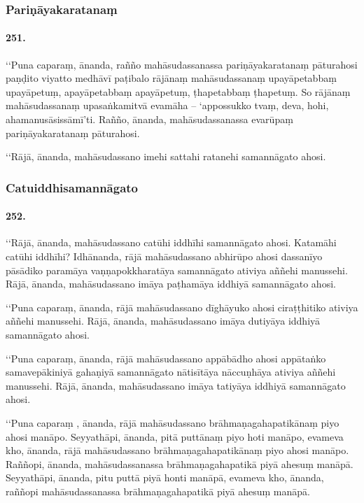 \subsubsection{Pariṇāyakaratanaṃ}

\paragraph{251.} ‘‘Puna caparaṃ, ānanda, rañño mahāsudassanassa pariṇāyakaratanaṃ pāturahosi paṇḍito viyatto medhāvī paṭibalo rājānaṃ mahāsudassanaṃ upayāpetabbaṃ upayāpetuṃ, apayāpetabbaṃ apayāpetuṃ, ṭhapetabbaṃ ṭhapetuṃ. So rājānaṃ mahāsudassanaṃ upasaṅkamitvā evamāha – ‘appossukko tvaṃ, deva, hohi, ahamanusāsissāmī’ti. Rañño, ānanda, mahāsudassanassa evarūpaṃ pariṇāyakaratanaṃ pāturahosi.

‘‘Rājā, ānanda, mahāsudassano imehi sattahi ratanehi samannāgato ahosi.

\subsubsection{Catuiddhisamannāgato}

\paragraph{252.} ‘‘Rājā, ānanda, mahāsudassano catūhi iddhīhi samannāgato ahosi. Katamāhi catūhi iddhīhi? Idhānanda, rājā mahāsudassano abhirūpo ahosi dassanīyo pāsādiko paramāya vaṇṇapokkharatāya samannāgato ativiya aññehi manussehi. Rājā, ānanda, mahāsudassano imāya paṭhamāya iddhiyā samannāgato ahosi.

‘‘Puna caparaṃ, ānanda, rājā mahāsudassano dīghāyuko ahosi ciraṭṭhitiko ativiya aññehi manussehi. Rājā, ānanda, mahāsudassano imāya dutiyāya iddhiyā samannāgato ahosi.

‘‘Puna caparaṃ, ānanda, rājā mahāsudassano appābādho ahosi appātaṅko samavepākiniyā gahaṇiyā samannāgato nātisītāya nāccuṇhāya ativiya aññehi manussehi. Rājā, ānanda, mahāsudassano imāya tatiyāya iddhiyā samannāgato ahosi.

‘‘Puna caparaṃ , ānanda, rājā mahāsudassano brāhmaṇagahapatikānaṃ piyo ahosi manāpo. Seyyathāpi, ānanda, pitā puttānaṃ piyo hoti manāpo, evameva kho, ānanda, rājā mahāsudassano brāhmaṇagahapatikānaṃ piyo ahosi manāpo. Raññopi, ānanda, mahāsudassanassa brāhmaṇagahapatikā piyā ahesuṃ manāpā. Seyyathāpi, ānanda, pitu puttā piyā honti manāpā, evameva kho, ānanda, raññopi mahāsudassanassa brāhmaṇagahapatikā piyā ahesuṃ manāpā.

